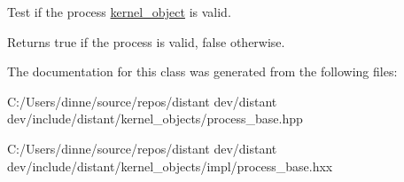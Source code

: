 Test if the process \mbox{\hyperlink{classdistant_1_1kernel__objects_1_1kernel__object}{kernel\+\_\+object}} is valid. 

\begin{DoxyReturn}{Returns}
true if the process is valid, false otherwise. 
\end{DoxyReturn}


The documentation for this class was generated from the following files\+:\begin{DoxyCompactItemize}
\item 
C\+:/\+Users/dinne/source/repos/distant dev/distant dev/include/distant/kernel\+\_\+objects/process\+\_\+base.\+hpp\item 
C\+:/\+Users/dinne/source/repos/distant dev/distant dev/include/distant/kernel\+\_\+objects/impl/process\+\_\+base.\+hxx\end{DoxyCompactItemize}

